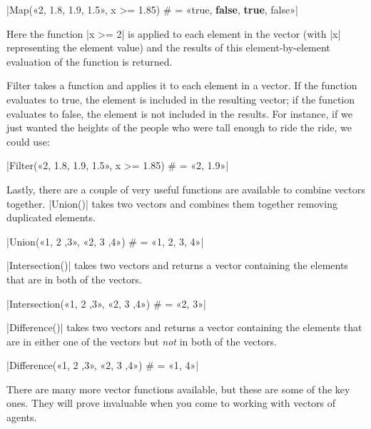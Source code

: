 \documentclass[]{memoir}
\newcommand{\KeywordTok}[1]{\textcolor[rgb]{0.00,0.44,0.13}{\textbf{{#1}}}}
\newcommand{\DecValTok}[1]{\textcolor[rgb]{0.25,0.63,0.44}{{#1}}}
\newcommand{\FloatTok}[1]{\textcolor[rgb]{0.25,0.63,0.44}{{#1}}}
\newcommand{\FunctionTok}[1]{\textcolor[rgb]{0.02,0.16,0.49}{{#1}}}
\newcommand{\NormalTok}[1]{{#1}}
\begin{document}
|\FunctionTok{Map}\NormalTok{(«2, }\FloatTok{1.8}\NormalTok{, }\FloatTok{1.9}\NormalTok{, }\FloatTok{1.5}\NormalTok{», x >= }\FloatTok{1.85}\NormalTok{) # = «true, }\KeywordTok{false}\NormalTok{, }\KeywordTok{true}\NormalTok{, false»}|

Here the function |\NormalTok{x >= }\DecValTok{2}| is applied to each
element in the vector (with |\NormalTok{x}| representing the element
value) and the results of this element-by-element evaluation of the
function is returned.

Filter takes a function and applies it to each element in a vector. If
the function evaluates to true, the element is included in the resulting
vector; if the function evaluates to false, the element is not included
in the results. For instance, if we just wanted the heights of the
people who were tall enough to ride the ride, we could use:

|\FunctionTok{Filter}\NormalTok{(«2, }\FloatTok{1.8}\NormalTok{, }\FloatTok{1.9}\NormalTok{, }\FloatTok{1.5}\NormalTok{», x >= }\FloatTok{1.85}\NormalTok{) # = «2, }\FloatTok{1.9}\NormalTok{»}|

Lastly, there are a couple of very useful functions are available to
combine vectors together. |\FunctionTok{Union}\NormalTok{()}| takes two
vectors and combines them together removing duplicated elements.

|\FunctionTok{Union}\NormalTok{(«1, }\DecValTok{2} \NormalTok{,}\DecValTok{3}\NormalTok{», «2, }\DecValTok{3} \NormalTok{,}\DecValTok{4}\NormalTok{») # = «1, }\DecValTok{2}\NormalTok{, }\DecValTok{3}\NormalTok{, }\DecValTok{4}\NormalTok{»}|

|\FunctionTok{Intersection}\NormalTok{()}| takes two vectors and returns
a vector containing the elements that are in both of the vectors.

|\FunctionTok{Intersection}\NormalTok{(«1, }\DecValTok{2} \NormalTok{,}\DecValTok{3}\NormalTok{», «2, }\DecValTok{3} \NormalTok{,}\DecValTok{4}\NormalTok{») # = «2, }\DecValTok{3}\NormalTok{»}|

|\FunctionTok{Difference}\NormalTok{()}| takes two vectors and returns a
vector containing the elements that are in either one of the vectors but
\emph{not} in both of the vectors.

|\FunctionTok{Difference}\NormalTok{(«1, }\DecValTok{2} \NormalTok{,}\DecValTok{3}\NormalTok{», «2, }\DecValTok{3} \NormalTok{,}\DecValTok{4}\NormalTok{») # = «1, }\DecValTok{4}\NormalTok{»}|

There are many more vector functions available, but these are some of
the key ones. They will prove invaluable when you come to working with
vectors of agents.
\end{document}
